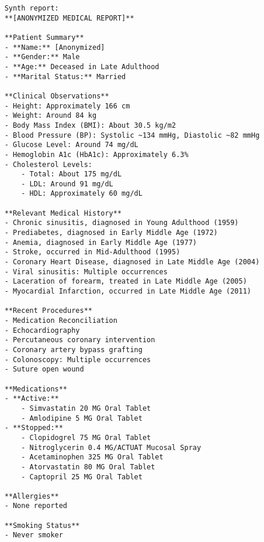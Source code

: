 \begin{lstlisting}
    Synth report:
    **[ANONYMIZED MEDICAL REPORT]**
    
    **Patient Summary**
    - **Name:** [Anonymized]
    - **Gender:** Male
    - **Age:** Deceased in Late Adulthood
    - **Marital Status:** Married
    
    **Clinical Observations**
    - Height: Approximately 166 cm
    - Weight: Around 84 kg
    - Body Mass Index (BMI): About 30.5 kg/m2
    - Blood Pressure (BP): Systolic ~134 mmHg, Diastolic ~82 mmHg
    - Glucose Level: Around 74 mg/dL
    - Hemoglobin A1c (HbA1c): Approximately 6.3%
    - Cholesterol Levels:
        - Total: About 175 mg/dL
        - LDL: Around 91 mg/dL
        - HDL: Approximately 60 mg/dL
    
    **Relevant Medical History**
    - Chronic sinusitis, diagnosed in Young Adulthood (1959)
    - Prediabetes, diagnosed in Early Middle Age (1972)
    - Anemia, diagnosed in Early Middle Age (1977)
    - Stroke, occurred in Mid-Adulthood (1995)
    - Coronary Heart Disease, diagnosed in Late Middle Age (2004)
    - Viral sinusitis: Multiple occurrences
    - Laceration of forearm, treated in Late Middle Age (2005)
    - Myocardial Infarction, occurred in Late Middle Age (2011)
    
    **Recent Procedures**
    - Medication Reconciliation
    - Echocardiography
    - Percutaneous coronary intervention
    - Coronary artery bypass grafting
    - Colonoscopy: Multiple occurrences
    - Suture open wound
    
    **Medications**
    - **Active:**
        - Simvastatin 20 MG Oral Tablet
        - Amlodipine 5 MG Oral Tablet
    - **Stopped:**
        - Clopidogrel 75 MG Oral Tablet
        - Nitroglycerin 0.4 MG/ACTUAT Mucosal Spray
        - Acetaminophen 325 MG Oral Tablet
        - Atorvastatin 80 MG Oral Tablet
        - Captopril 25 MG Oral Tablet
    
    **Allergies**
    - None reported
    
    **Smoking Status**
    - Never smoker
        
\end{lstlisting}
